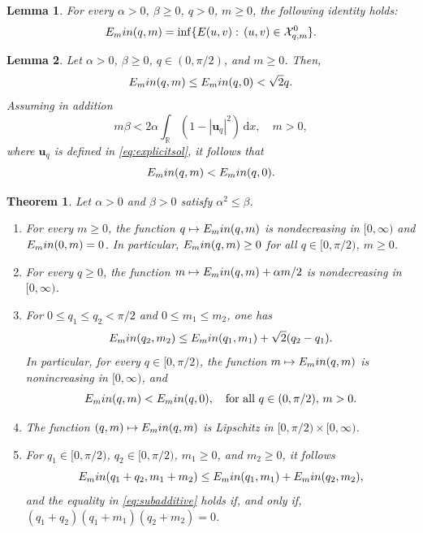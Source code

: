 \documentclass[10pt,a4paper]{amsart}
\newtheorem{theorem}{Theorem}
\newtheorem{lemma}{Lemma}
\newcommand{\Emin}{E_\textup{min}}
\newcommand{\R}{\mathbb{R}}
\newcommand{\boX}{\mathcal{X}}
\newcommand{\bu}{\mathbf{u}}
\renewcommand{\d}{\,\mathrm{d}}
\begin{document}
\begin{lemma}\label{lemma:sameinf}
    For every $\alpha>0$, $\beta\geq 0$, $q>0$, $m\geq 0$, the following identity holds: \[\Emin(q,m)=\inf\{E(u,v):\, (u,v)\in \boX^0_{q,m}\}.\]
\end{lemma}

\begin{lemma}\label{lemma:smallE}
    Let $\alpha>0$, $\beta\geq 0$, $q\in(0,\pi/2)$, and $m\geq 0$. Then, 
    \begin{equation}\label{eq:eminineq}
        \Emin(q,m)\leq \Emin(q,0)<\sqrt{2}q.
    \end{equation}
    Assuming in addition 
    \begin{equation}\label{eq:alphabeta}
        m\beta< 2\alpha\int_\R(1-|\mathbf{u}_q|^2)\d x, \quad m>0,
    \end{equation}
    where $\bu_q$ is defined in \eqref{eq:explicitsol}, it follows that
    \begin{equation}\label{eq:keyineq}
        \Emin(q,m)<\Emin(q,0).
    \end{equation}
\end{lemma}

\begin{theorem}\label{thm:properties}
	Let $\alpha>0$ and $\beta > 0$ satisfy $\alpha^2\leq\beta$. 
	\begin{enumerate}
		\item \label{item:monotoneq} For every $m\geq 0$, the function $q\mapsto \Emin(q,m)$ is nondecreasing in $[0,\infty)$ and $\Emin(0,m)=0$. In particular, $\Emin(q,m)\geq 0$ for all $q\in [0,\pi/2)$, $m\geq 0$.
		\item \label{item:monotonem} For every $q\geq 0$, the function $m\mapsto \Emin(q,m)+\alpha m/2$ is nondecreasing in $[0,\infty)$. 
		\item \label{item:decreasingm} For $0\leq  q_1\leq q_2<\pi/2$ and $0\leq m_1\leq m_2$, one has
			\begin{equation}\label{lipsineq}
				\Emin(q_2,m_2)\leq \Emin(q_1,m_1)+\sqrt{2}(q_2-q_1).
			\end{equation}
            In particular, for every $q\in [0,\pi/2)$, the function $m\mapsto \Emin(q,m)$ is nonincreasing in $[0,\infty)$, and
            \begin{equation}\label{eq:energeticallyfav}
            \Emin(q,m)<\Emin(q,0),\quad\text{for all }q\in (0,\pi/2),\, m>0.
            \end{equation}
		\item  \label{item:lipschitz} The function $(q,m)\mapsto\Emin(q,m)$ is Lipschitz in $[0,\pi/2)\times[0,\infty)$.
        \item \label{item:subadd} For $q_1\in [0,\pi/2)$, $q_2\in [0,\pi/2)$, $m_1\geq 0$, and $m_2\geq 0$, it follows 
    \begin{equation}\label{eq:subadditive}
    \Emin(q_1+q_2,m_1+m_2)\leq\Emin(q_1,m_1)+\Emin(q_2,m_2),
    \end{equation}
    and the equality in \eqref{eq:subadditive} holds if, and only if, $(q_1+q_2)(q_1+m_1)(q_2+m_2)=0$.
    
	\end{enumerate}
\end{theorem}
\end{document}
